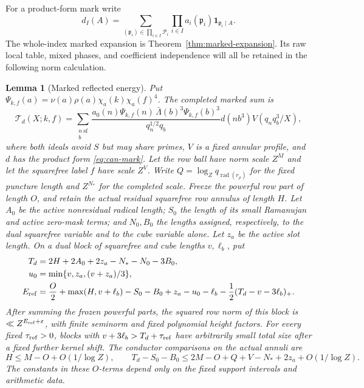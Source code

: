 \documentclass[11pt,a4paper]{article}
\numberwithin{equation}{section}
\newtheorem{lemma}[theorem]{Lemma}
\theoremstyle{definition}
\theoremstyle{remark}
\newcommand{\eps}{\varepsilon}
\newcommand{\rad}{\operatorname{rad}}
\begin{document}
For a product-form mark write
\begin{equation}\label{eq:can-mark}
 d_I(A)=\sum_{(\mathfrak p_i)\in\prod_{i\in I}\mathcal P_i}
           \prod_{i\in I}a_i(\mathfrak p_i)\mathbf1_{\mathfrak p_i\mid A}.
\end{equation}
The whole-index marked expansion is Theorem~\ref{thm:marked-expansion}.
Its raw local table, mixed phases, and coefficient independence will all
be retained in the following norm calculation.

\begin{lemma}[Marked reflected energy]\label{lem:can-marked-energy}
Put $\Psi_{k,f}(a)=\nu(a)\rho(a)\chi_a(k)\chi_a(f)^4$.
The completed marked sum is
\begin{equation}\label{eq:can-completed-marked}
 \mathcal T_d(X;k,f)=
 \sum_{\substack{n\ \mathrm{sf}\\ b}}
 \frac{a_0(n)\Psi_{k,f}(n)\,
       \bar\Lambda(b)^3\Psi_{k,f}(b)^3}{q_n^{1/2}q_b}
       d(nb^3)V(q_nq_b^3/X),
\end{equation}
where both ideals avoid $S$ but may share primes, $V$ is a fixed
annular profile, and $d$ has the product form \eqref{eq:can-mark}.
Let the row ball have norm scale $Z^M$ and let the squarefree label
$f$ have scale $Z^V$.  Write $Q=\log_Zq_{\rad(r_\rho)}$ for the
fixed puncture length and $Z^{N_*}$ for the completed scale.
Freeze the powerful row part of length $O$, and retain the actual
residual squarefree row annulus of length $H$.
Let $A_0$ be the active nonresidual radical length; $S_0$ the length
of its small Ramanujan and active zero-mask terms; and $N_0,B_0$ the
lengths assigned, respectively, to the dual squarefree variable and
to the cube variable alone.  Let $z_a$ be the active slot length.
On a dual block of squarefree and cube lengths $v,\ell_b$, put
\begin{align}\label{eq:can-energy-data}
 T_d&=2H+2A_0+2z_a-N_*-N_0-3B_0,\notag\\
 u_0&=\min\{v,z_a,(v+z_a)/3\},\\
 E_{\rm ref}&=\frac O2+\max(H,v+\ell_b)-S_0-B_0+z_a-u_0-\ell_b
                  -\frac12(T_d-v-3\ell_b)_+ .\label{eq:can-Eref}
\end{align}
After summing the frozen powerful parts, the squared row norm of this
block is $\ll Z^{E_{\rm ref}+\eps}$, with finite seminorm and fixed
polynomial height factors.  For every fixed $\tau_{\rm ref}>0$,
blocks with $v+3\ell_b>T_d+\tau_{\rm ref}$ have arbitrarily small
total size after a fixed further kernel shift.  The conductor
comparisons on the actual annuli are
\begin{equation}\label{eq:can-conductor-comparison}
 H\le M-O+O(1/\log Z),\qquad
 T_d-S_0-B_0\le2M-O+Q+V-N_*+2z_a+O(1/\log Z).
\end{equation}
The constants in these $O$-terms depend only on the fixed support
intervals and arithmetic data.
\end{lemma}
\end{document}
